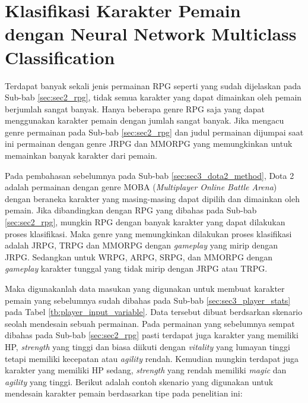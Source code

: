 \section{Klasifikasi Karakter Pemain dengan Neural Network Multiclass Classification}
\label{sec:sec3_player_method}
\vspace{1ex}

Terdapat banyak sekali jenis permainan RPG seperti yang sudah dijelaskan pada Sub-bab \ref{sec:sec2_rpg}, tidak semua karakter yang dapat dimainkan oleh pemain berjumlah sangat banyak. Hanya beberapa genre RPG saja yang dapat menggunakan karakter pemain dengan jumlah sangat banyak. Jika mengacu genre permainan pada Sub-bab \ref{sec:sec2_rpg} dan judul permainan dijumpai saat ini permainan dengan genre JRPG dan MMORPG yang memungkinkan untuk memainkan banyak karakter dari pemain.
\vspace{1ex}

Pada pembahasan sebelumnya pada Sub-bab \ref{sec:sec3_dota2_method}, Dota 2 adalah permainan dengan genre MOBA (\textit{Multiplayer Online Battle Arena}) dengan beraneka karakter yang masing-masing dapat dipilih dan dimainkan oleh pemain. Jika dibandingkan dengan RPG yang dibahas pada Sub-bab \ref{sec:sec2_rpg}, mungkin RPG dengan banyak karakter yang dapat dilakukan proses klasifikasi. Maka genre yang memungkinkan dilakukan proses klasifikasi adalah JRPG, TRPG dan MMORPG dengan \textit{gameplay} yang mirip dengan JRPG. Sedangkan untuk WRPG, ARPG, SRPG, dan MMORPG dengan \textit{gameplay} karakter tunggal yang tidak mirip dengan JRPG atau TRPG.
\vspace{1ex}

Maka digunakanlah data masukan yang digunakan untuk membuat karakter pemain yang sebelumnya sudah dibahas pada Sub-bab \ref{sec:sec3_player_stats} pada Tabel \ref{tb:player_input_variable}. Data tersebut dibuat berdsarkan skenario seolah mendesain sebuah permainan. Pada permainan yang sebelumnya sempat dibahas pada Sub-bab \ref{sec:sec2_rpg} pasti terdapat juga karakter yang memiliki HP, \textit{strength} yang tinggi dan biasa diikuti dengan \textit{vitality} yang lumayan tinggi tetapi memiliki kecepatan atau \textit{agility} rendah. Kemudian mungkin terdapat juga karakter yang memiliki HP sedang, \textit{strength} yang rendah memiliki \textit{magic} dan \textit{agility} yang tinggi. Berikut adalah contoh skenario yang digunakan untuk mendesain karakter pemain berdasarkan tipe pada penelitian ini:

